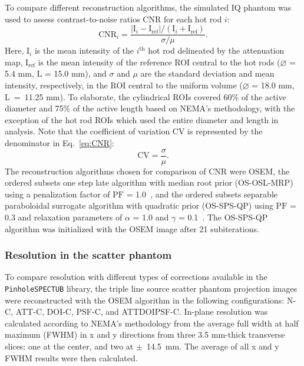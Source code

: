 \documentclass[utf8]{FrontiersinVancouver}
\begin{document}
To compare different reconstruction algorithms, the simulated IQ phantom was used to assess contrast-to-noise ratios $\mathrm{CNR}$ for each hot rod $i$:
\begin{equation}\label{eq:CNR}
	\mathrm{CNR}_i = \frac{|\mathrm{I}_i - \mathrm{I}_\mathrm{ref}|/(\mathrm{I}_i + \mathrm{I}_\mathrm{ref})}{\sigma / \mu}.
\end{equation}
Here, $\mathrm{I}_i$ is the mean intensity of the $i^\mathrm{th}$ hot rod delineated by the attenuation map, $\mathrm{I}_\mathrm{ref}$ is the mean intensity of the reference ROI central to the hot rods ($\diameter$ = 5.4 mm, $\mathrm{L}$ = 15.0 mm), and $\sigma$ and $\mu$ are the standard deviation and mean intensity, respectively, in the ROI central to the uniform volume ($\diameter$ = 18.0 mm, $\mathrm{L}$~=~11.25 mm). To elaborate, the cylindrical ROIs covered 60\% of the active diameter and 75\% of the active length based on NEMA's methodology, with the exception of the hot rod ROIs which used the entire diameter and length in analysis. Note that the coefficient of variation $\mathrm{CV}$ is represented by the denominator in Eq.~\ref{eq:CNR}:
\begin{equation}\label{eq:CV}
\mathrm{CV} = \frac{\sigma}{\mu}.
\end{equation}
The reconstruction algorithms chosen for comparison of $\mathrm{CNR}$ were OSEM, the ordered subsets one step late algorithm with median root prior (OS-OSL-MRP) using a penalization factor of $\mathrm{PF}$ = 1.0~\citep{green_use_1990}, and the ordered subsets separable paraboloidal surrogate algorithm with quadratic prior (OS-SPS-QP) using $\mathrm{PF}$ = 0.3 and relaxation parameters of $\alpha$ = 1.0 and $\gamma$ = 0.1~\citep{ahn_globally_2003}. The OS-SPS-QP algorithm was initialized with the OSEM image after 21 subiterations.

\subsubsection{Resolution in the scatter phantom}

To compare resolution with different types of corrections available in the \texttt{PinholeSPECTUB} library, the triple line source scatter phantom projection images were reconstructed with the OSEM algorithm in the following configurations: N-C, ATT-C, DOI-C, PSF-C, and ATTDOIPSF-C. In-plane resolution was calculated according to NEMA's methodology from the average full width at half maximum (FWHM) in x and y directions from three 3.5 mm-thick transverse slices: one at the center, and two at $\pm$~14.5~mm. The average of all x and y FWHM results were then calculated.
\end{document}
